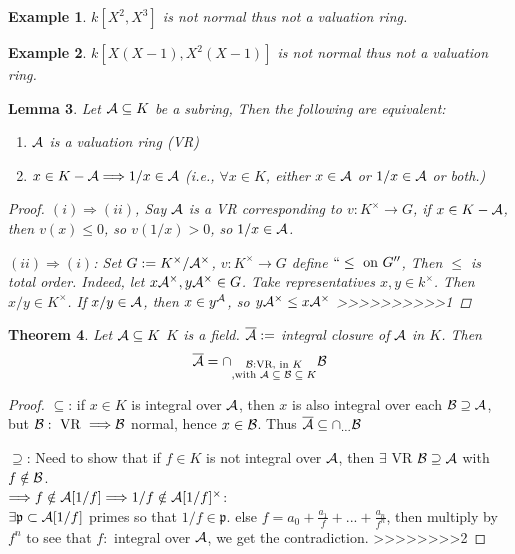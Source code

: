 \documentclass[11pt]{article}
\newtheorem{thm}{Theorem}[section]
\newtheorem{lemma}[thm]{Lemma}
\newtheorem{ex}[thm]{Example}
\newcommand{\scp}{{\mathfrak p}}
\newcommand{\cala}{{\cal A}}
\newcommand{\calb}{{\cal B}}
\newcommand{\Lrta}{\Longrightarrow}
\newcommand{\lrta}{\longrightarrow}
\begin{document}
\begin{ex}
$k[X^2,X^3]$ is not normal thus not a valuation ring.
\end{ex}
\begin{ex}
$k[X(X-1),X^2(X-1)]$ is not normal thus not a valuation ring.
\end{ex}

\begin{lemma}
Let $\cala\subseteq K$ be a subring, Then the following are equivalent:
\begin{enumerate}[label=(\roman*)]
\item $\cala$ is a valuation ring (VR)
\item $x\in K-\cala\Lrta 1/x\in \cala$ (i.e., $\forall x\in K$, either $x\in \cala$ or $1/x\in \cala$ or both.)
\end{enumerate}
\begin{proof}
$(i)\Lrta (ii)$, Say $\cala$ is a VR
 corresponding to $v:K^\times\lrta G$, if $x\in K-\cala$, then $v(x)\leq 0$, so $v(1/x)>0$, so $1/x\in \cala$.

 $(ii)\Lrta (i)$: Set $G:=K^\times/\cala^\times$, $v:K^\times\lrta G$
 define $``\leq \text{ on }G''$, Then $\leq $ is total order. Indeed, let $x\cala^\times, y\cala^\times\in G$. Take representatives $x,y\in k^\times$. Then $x/y\in K^\times$. If $x/y\in \cala$, then $x\in y^\cala$, so $y \cala^\times\leq x \cala^\times$ 
 >>>>>>>>>>1
\end{proof}
\end{lemma}

\begin{thm}\label{thm:integral_closure_VR}
Let $\cala\subseteq K$ $K$ is a field. $\overline{\cala}:=$ integral closure of $\cala$ in $K$. Then 
$$
\overline{\cala}=\cap_{\substack{\calb:\text{VR, in $K$}\\, \text{with $\cala\subseteq \calb\subseteq K$}}}\calb
$$
\end{thm}
\begin{proof}
$\subseteq$: if $x\in K$ is integral over $\cala$, then $x$ is also integral over each $\calb\supseteq \cala$, but $\calb: \text{ VR }\Lrta\calb$ normal, hence $x\in \calb$. Thus $\overline{\cala}\subseteq \cap_{...}\calb$

$\supseteq$: Need to show that if $f\in K$ is not integral over $\cala$, then $\exists $ VR $\calb\supseteq \cala$ with $f\notin \calb$.\\
$\Lrta f\notin \cala[1/f]\Lrta 1/f\notin \cala[1/f]^\times$: \\
$\exists \scp\subset\cala[1/f]$ primes so that $1/f\in \scp$.
else $f=a_0+\frac{a_1}{f}+...+\frac{a_n}{f^n}$, then multiply by $f^n$ to see that $f:$ integral over $\cala$, we get the contradiction.
>>>>>>>>2
\end{proof}
\end{document}
